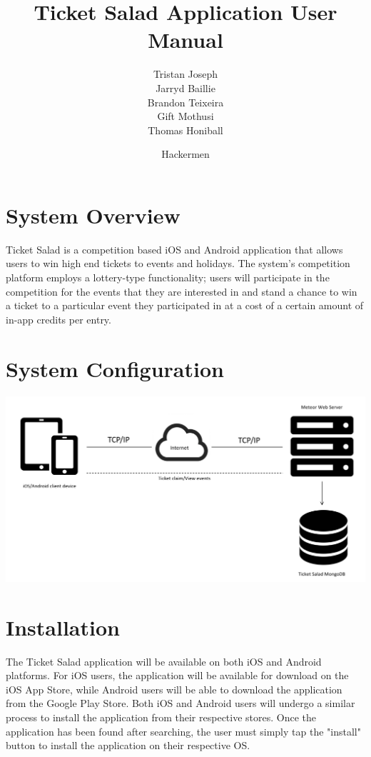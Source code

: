 \documentclass[11pt]{article}
\begin{document}
	\title{Ticket Salad Application User Manual}
	\date{Hackermen}
		
	\author{Tristan Joseph \\ Jarryd Baillie \\ Brandon Teixeira \\ Gift Mothusi \\ Thomas Honiball }

		
	\maketitle
	\tableofcontents
	\newpage
	
	\section{System Overview}
	Ticket Salad is a competition based iOS and Android application that allows users to win high end
	tickets to events and holidays. The system's competition platform employs a
	lottery-type functionality; users will participate in the competition for the
	events that they are interested in and stand a chance to win a ticket to a
	particular event they participated in at a cost of a certain amount of in-app credits per entry.
	
	\section{System Configuration}

  	\includegraphics[width=\linewidth]{config.png}
	
	\section{Installation}
	
	The Ticket Salad application will be available on both iOS and Android platforms.
	For iOS users, the application will be available for download on the iOS App Store, while
	Android users will be able to download the application from the Google Play Store. Both iOS and Android 		users will undergo a similar process to install the application from their respective stores. Once the application 	has been found after searching, the user must simply tap the "install" button to install the application on their 	respective OS.
	
\end{document}
